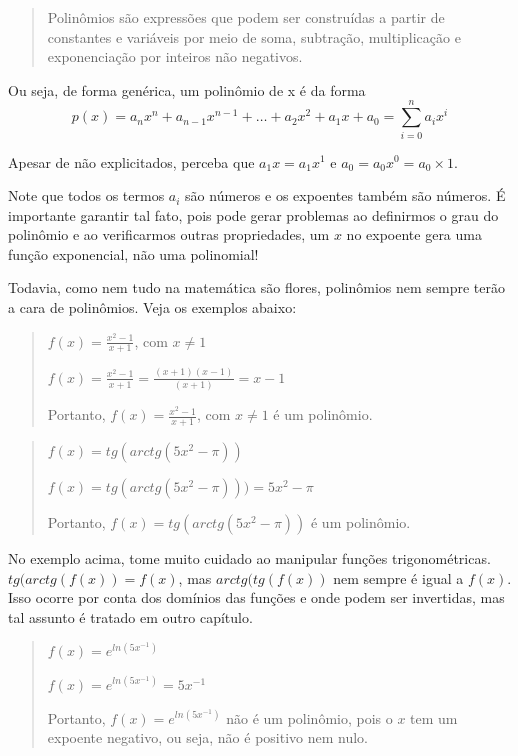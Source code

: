 \documentclass[
  portuguese,
  letterpaper,
  DIV=11,
  numbers=noendperiod]{scrreport}
\begin{document}
\begin{quote}
Polinômios são expressões que podem ser construídas a partir de
constantes e variáveis por meio de soma, subtração, multiplicação e
exponenciação por inteiros não negativos.
\end{quote}

Ou seja, de forma genérica, um polinômio de x é da forma \[
p(x) = a_{n}x^{n} + a_{n-1} x^{n-1} + \dots + a_{2}x^{2}+a_{1}x+a_{0} = \sum_{i=0}^{n} a_{i} x^{i}
\]

Apesar de não explicitados, perceba que \(a_1x = a_1x^1\) e
\(a_0 = a_0x^0 = a_0\times1\).

Note que todos os termos \(a_i\) são números e os expoentes também são
números. É importante garantir tal fato, pois pode gerar problemas ao
definirmos o grau do polinômio e ao verificarmos outras propriedades, um
\(x\) no expoente gera uma função exponencial, não uma polinomial!

Todavia, como nem tudo na matemática são flores, polinômios nem sempre
terão a cara de polinômios. Veja os exemplos abaixo:

\begin{quote}
\(f(x) =\frac{x^2-1}{x+1}\), com \(x\neq1\)

\(f(x)=\frac{x^2-1}{x+1}=  \frac{(x+1)(x-1)}{(x+1)} =x-1\)

Portanto, \(f(x) = \frac{x^2-1}{x+1}\), com \(x\neq1\) é um polinômio.
\end{quote}

\begin{quote}
\(f(x)=tg(arctg(5x^2-\pi))\)

\(f(x) = tg(arctg(5x^2-\pi))) = 5x^2-\pi\)

Portanto, \(f(x)=tg(arctg(5x^2-\pi))\) é um polinômio.
\end{quote}

No exemplo acima, tome muito cuidado ao manipular funções
trigonométricas. \(tg(arctg(f(x))=f(x)\), mas \(arctg(tg(f(x))\) nem
sempre é igual a \(f(x)\). Isso ocorre por conta dos domínios das
funções e onde podem ser invertidas, mas tal assunto é tratado em outro
capítulo.

\begin{quote}
\(f(x) = e^{ln(5 x^{-1})}\)

\(f(x) = e^{ln(5 x^{-1})} = 5x^{-1}\)

Portanto, \(f(x) = e^{ln(5 x^{-1})}\) não é um polinômio, pois o \(x\)
tem um expoente negativo, ou seja, não é positivo nem nulo.
\end{quote}
\end{document}
